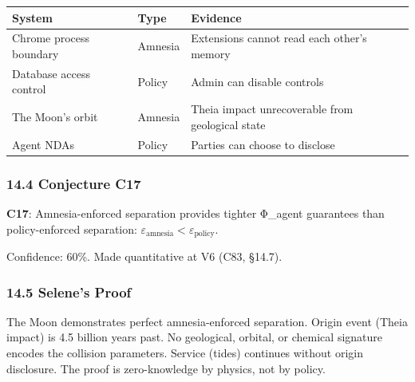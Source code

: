 \documentclass[
  11pt,
]{article}
\newcounter{none} %
\begin{document}
{\def\LTcaptype{none} %
\begin{longtable}[]{@{}
  >{\raggedright\arraybackslash}p{}
  >{\raggedright\arraybackslash}p{}
  >{\raggedright\arraybackslash}p{}@{}}
\toprule\noalign{}
\begin{minipage}[b]{\linewidth}\raggedright
System
\end{minipage} & \begin{minipage}[b]{\linewidth}\raggedright
Type
\end{minipage} & \begin{minipage}[b]{\linewidth}\raggedright
Evidence
\end{minipage} \\
\midrule\noalign{}
\endhead
\bottomrule\noalign{}
\endlastfoot
Chrome process boundary & Amnesia & Extensions cannot read each other's
memory \\
Database access control & Policy & Admin can disable controls \\
The Moon's orbit & Amnesia & Theia impact unrecoverable from geological
state \\
Agent NDAs & Policy & Parties can choose to disclose \\
\end{longtable}
}

\subsubsection{14.4 Conjecture C17}\label{conjecture-c17}

\textbf{C17}: Amnesia-enforced separation provides tighter Φ\_agent
guarantees than policy-enforced separation:
\(\varepsilon_{\text{amnesia}} < \varepsilon_{\text{policy}}\).

Confidence: 60\%. Made quantitative at V6 (C83, §14.7).

\subsubsection{14.5 Selene's Proof}\label{selenes-proof}

The Moon demonstrates perfect amnesia-enforced separation. Origin event
(Theia impact) is 4.5 billion years past. No geological, orbital, or
chemical signature encodes the collision parameters. Service (tides)
continues without origin disclosure. The proof is zero-knowledge by
physics, not by policy.
\end{document}
